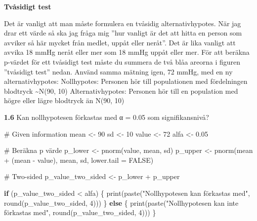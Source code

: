 \documentclass[
  letterpaper,
  DIV=11,
  numbers=noendperiod]{scrartcl}
\newenvironment{Shaded}{\begin{snugshade}}{\end{snugshade}}
\newcommand{\AttributeTok}[1]{\textcolor[rgb]{0.40,0.45,0.13}{#1}}
\newcommand{\CommentTok}[1]{\textcolor[rgb]{0.37,0.37,0.37}{#1}}
\newcommand{\ConstantTok}[1]{\textcolor[rgb]{0.56,0.35,0.01}{#1}}
\newcommand{\ControlFlowTok}[1]{\textcolor[rgb]{0.00,0.23,0.31}{\textbf{#1}}}
\newcommand{\DecValTok}[1]{\textcolor[rgb]{0.68,0.00,0.00}{#1}}
\newcommand{\FloatTok}[1]{\textcolor[rgb]{0.68,0.00,0.00}{#1}}
\newcommand{\FunctionTok}[1]{\textcolor[rgb]{0.28,0.35,0.67}{#1}}
\newcommand{\NormalTok}[1]{\textcolor[rgb]{0.00,0.23,0.31}{#1}}
\newcommand{\OtherTok}[1]{\textcolor[rgb]{0.00,0.23,0.31}{#1}}
\newcommand{\SpecialCharTok}[1]{\textcolor[rgb]{0.37,0.37,0.37}{#1}}
\newcommand{\StringTok}[1]{\textcolor[rgb]{0.13,0.47,0.30}{#1}}
\begin{document}
\textbf{Tvåsidigt test}

Det är vanligt att man måste formulera en tvåsidig alternativhypotes.
När jag drar ett värde så ska jag fråga mig ''hur vanligt är det att
hitta en person som avviker så här mycket från medlet, uppåt eller
neråt''. Det är lika vanligt att avvika 18 mmHg neråt eller mer som 18
mmHg uppåt eller mer. För att beräkna p-värdet för ett tvåsidigt test
måste du summera de två blåa areorna i figuren ''tvåsidigt test'' nedan.
Använd samma mätning igen, 72 mmHg, med en ny alternativhypotes:
Nollhypotes: Personen hör till populationen med fördelningen blodtryck
\textasciitilde N(90, 10) Alternativhypotes: Personen hör till en
population med högre eller lägre blodtryck än N(90, 10)

\textbf{1.6} Kan nollhypotesen förkastas med α = 0.05 som
signifikansnivå?

\begin{Shaded}
\begin{Highlighting}[]
\CommentTok{\# Given information}
\NormalTok{mean }\OtherTok{\textless{}{-}} \DecValTok{90}
\NormalTok{sd }\OtherTok{\textless{}{-}} \DecValTok{10}
\NormalTok{value }\OtherTok{\textless{}{-}} \DecValTok{72}
\NormalTok{alfa }\OtherTok{\textless{}{-}} \FloatTok{0.05}

\CommentTok{\# Beräkna p värde}
\NormalTok{p\_lower }\OtherTok{\textless{}{-}} \FunctionTok{pnorm}\NormalTok{(value, mean, sd)}
\NormalTok{p\_upper }\OtherTok{\textless{}{-}} \FunctionTok{pnorm}\NormalTok{(mean }\SpecialCharTok{+}\NormalTok{ (mean }\SpecialCharTok{{-}}\NormalTok{ value), mean, sd, }\AttributeTok{lower.tail =} \ConstantTok{FALSE}\NormalTok{)}

\CommentTok{\# Two{-}sided}
\NormalTok{p\_value\_two\_sided }\OtherTok{\textless{}{-}}\NormalTok{ p\_lower }\SpecialCharTok{+}\NormalTok{ p\_upper}

\ControlFlowTok{if}\NormalTok{ (p\_value\_two\_sided }\SpecialCharTok{\textless{}}\NormalTok{ alfa) \{}
  \FunctionTok{print}\NormalTok{(}\FunctionTok{paste}\NormalTok{(}\StringTok{"Nollhypotesen kan förkastas med"}\NormalTok{, }\FunctionTok{round}\NormalTok{(p\_value\_two\_sided, }\DecValTok{4}\NormalTok{)))}
\NormalTok{\} }\ControlFlowTok{else}\NormalTok{ \{}
  \FunctionTok{print}\NormalTok{(}\FunctionTok{paste}\NormalTok{(}\StringTok{"Nollhypotesen kan inte förkastas med"}\NormalTok{, }\FunctionTok{round}\NormalTok{(p\_value\_two\_sided, }\DecValTok{4}\NormalTok{)))}
\NormalTok{\}}
\end{Highlighting}
\end{Shaded}
\end{document}
